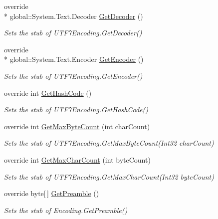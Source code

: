 \begin{DoxyCompactItemize}
override \\*
global\-::\-System.\-Text.\-Decoder \hyperlink{class_system_1_1_text_1_1_fakes_1_1_stub_u_t_f7_encoding_a8b839308676f4358b6c3058d1052719a}{Get\-Decoder} ()
\begin{DoxyCompactList}\small\item\em Sets the stub of U\-T\-F7\-Encoding.\-Get\-Decoder()\end{DoxyCompactList}\item 
override \\*
global\-::\-System.\-Text.\-Encoder \hyperlink{class_system_1_1_text_1_1_fakes_1_1_stub_u_t_f7_encoding_a56facff173c64e5bf3e2097bf95d3b7d}{Get\-Encoder} ()
\begin{DoxyCompactList}\small\item\em Sets the stub of U\-T\-F7\-Encoding.\-Get\-Encoder()\end{DoxyCompactList}\item 
override int \hyperlink{class_system_1_1_text_1_1_fakes_1_1_stub_u_t_f7_encoding_a539f2d53d3006581517e8d99bae9111b}{Get\-Hash\-Code} ()
\begin{DoxyCompactList}\small\item\em Sets the stub of U\-T\-F7\-Encoding.\-Get\-Hash\-Code()\end{DoxyCompactList}\item 
override int \hyperlink{class_system_1_1_text_1_1_fakes_1_1_stub_u_t_f7_encoding_a47ce4317881b2ecb004b9cfe1d9a6854}{Get\-Max\-Byte\-Count} (int char\-Count)
\begin{DoxyCompactList}\small\item\em Sets the stub of U\-T\-F7\-Encoding.\-Get\-Max\-Byte\-Count(\-Int32 char\-Count)\end{DoxyCompactList}\item 
override int \hyperlink{class_system_1_1_text_1_1_fakes_1_1_stub_u_t_f7_encoding_a85a229f06ffc51a5bf952de02051d9b8}{Get\-Max\-Char\-Count} (int byte\-Count)
\begin{DoxyCompactList}\small\item\em Sets the stub of U\-T\-F7\-Encoding.\-Get\-Max\-Char\-Count(\-Int32 byte\-Count)\end{DoxyCompactList}\item 
override byte\mbox{[}$\,$\mbox{]} \hyperlink{class_system_1_1_text_1_1_fakes_1_1_stub_u_t_f7_encoding_a754d5ce5df7083697a6efe4d25b15e14}{Get\-Preamble} ()
\begin{DoxyCompactList}\small\item\em Sets the stub of Encoding.\-Get\-Preamble()\end{DoxyCompactList}\item 

\end{DoxyCompactItemize}
